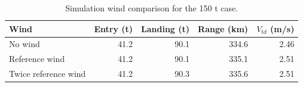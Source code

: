 \begin{table}[htbp]
\caption{Simulation wind comparison for the 150 t case.}
\label{tab:src9}
\small
\setlength{\tabcolsep}{3.5pt}
\begin{tabularx}{\linewidth}{@{}Xrrrr@{}}
\toprule
Wind & Entry (t) & Landing (t) & Range (km) & $V_{td}$ (m/s) \\
\midrule
No wind & 41.2 & 90.1 & 334.6 & 2.46 \\
Reference wind & 41.2 & 90.1 & 335.1 & 2.51 \\
Twice reference wind & 41.2 & 90.3 & 335.6 & 2.51 \\
\bottomrule
\end{tabularx}
\par{}
\end{table}
